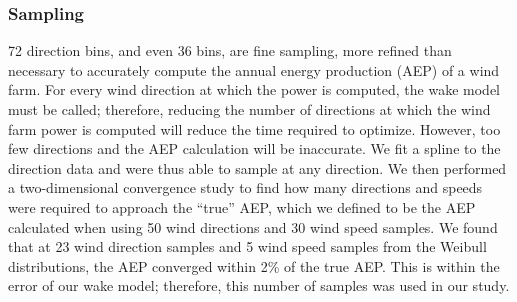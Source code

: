 \subsubsection{Sampling}
72 direction bins, and even 36 bins,
are fine sampling, 
more refined than necessary to accurately compute the annual energy production (AEP) of a wind farm. 
For every wind direction at which the power is computed, the wake model must be called; therefore, reducing the number of directions at which the wind farm power is computed will reduce the time required to optimize. 
However, too few directions and the AEP calculation will be inaccurate. We fit a spline to the direction data and were thus able to sample at any direction. We then performed a two-dimensional convergence study to find how many directions and speeds were required to approach the ``true'' AEP, which we defined to be the AEP calculated when using 50 wind directions and 30 wind speed samples. 
We found that at 23 wind direction samples and 5 wind speed samples from the Weibull distributions, the AEP converged within 2\% of the true AEP. This is within the error of our wake model; therefore, this number of samples was used in our study. 
